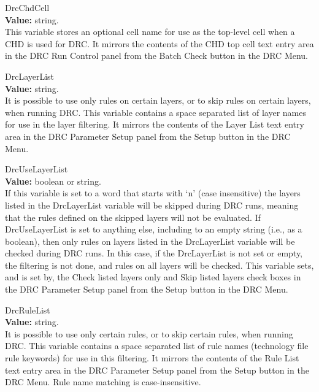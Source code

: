 \begin{description}
\item{\et DrcChdCell}\\
{\bf Value:} string.\\
This variable stores an optional cell name for use as the top-level
cell when a CHD is used for DRC.  It mirrors the contents of the {\cb
CHD top cell} text entry area in the {\cb DRC Run Control} panel from
the {\cb Batch Check} button in the {\cb DRC Menu}.

\item{\et DrcLayerList}\\
{\bf Value:} string.\\
It is possible to use only rules on certain layers, or to skip rules
on certain layers, when running DRC.  This variable contains a space
separated list of layer names for use in the layer filtering.  It
mirrors the contents of the {\cb Layer List} text entry area in the
{\cb DRC Parameter Setup} panel from the {\cb Setup} button in the
{\cb DRC Menu}.

\item{\et DrcUseLayerList}\\
{\bf Value:} boolean or string.\\
If this variable is set to a word that starts with `{\vt n}' (case
insensitive) the layers listed in the {\et DrcLayerList} variable will
be skipped during DRC runs, meaning that the rules defined on the
skipped layers will not be evaluated.  If {\et DrcUseLayerList} is set
to anything else, including to an empty string (i.e., as a boolean),
then only rules on layers listed in the {\et DrcLayerList} variable
will be checked during DRC runs.  In this case, if the {\et
DrcLayerList} is not set or empty, the filtering is not done, and
rules on all layers will be checked.  This variable sets, and is set
by, the {\cb Check listed layers only} and {\cb Skip listed layers}
check boxes in the {\cb DRC Parameter Setup} panel from the {\cb
Setup} button in the {\cb DRC Menu}.

\item{\et DrcRuleList}\\
{\bf Value:} string.\\
It is possible to use only certain rules, or to skip certain rules,
when running DRC.  This variable contains a space separated list of
rule names (technology file rule keywords) for use in this filtering. 
It mirrors the contents of the {\cb Rule List} text entry area in the
{\cb DRC Parameter Setup} panel from the {\cb Setup} button in the
{\cb DRC Menu}.  Rule name matching is case-insensitive.


\end{description}

